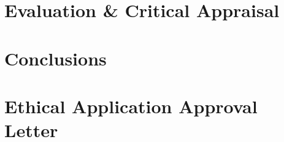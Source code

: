 \documentclass[11pt,openright,twoside,a4paper]{report}
\begin{document}
\chapter{Evaluation \& Critical Appraisal}
\label{ch:chapter7}


\chapter{Conclusions}
\label{ch:chapter8}




\let\cleardoublepage\clearpage %
\appendix

\chapter{Ethical Application Approval Letter}
\label{ch:appendix-ethical-approval-letter}

\end{document}
